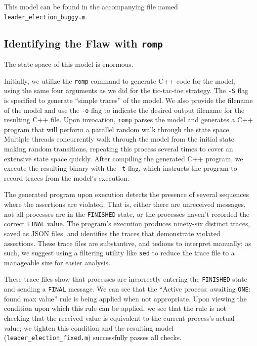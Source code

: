 This model can be found in the accompanying file named
\texttt{leader\_election\_buggy.m}.

\subsection{Identifying the Flaw with \texttt{romp}}\label{subsec:identifying-the-flaw-in-romp}

The state space of this model is enormous.

Initially, we utilize the \texttt{romp} command to generate C++ code for the
model, using the same four arguments as we did for the tic-tac-toe strategy.
The \texttt{-S} flag is specified to generate ``simple traces'' of the model.
We also provide the filename of the model and use the \texttt{-o} flag to
indicate the desired output filename for the resulting C++ file.
Upon invocation, \texttt{romp} parses the model and generates a C++ program
that will perform a parallel random walk through the state space.
Multiple threads concurrently walk through the model from the initial state
making random transitions, repeating this process several times to
cover an extensive state space quickly.
After compiling the generated C++ program, we execute the resulting binary
with the \texttt{-t} flag, which instructs the program to record traces from
the model's execution.

The generated program upon execution detects the presence of several sequences
where the assertions are violated.
That is, either there are unreceived messages,
not all processes are in the \texttt{FINISHED} state,
or the processes haven't recorded the correct \texttt{FINAL} value.
The program's execution produces ninety-six distinct traces,
saved as JSON files, and identifies the traces that demonstrate violated
assertions.
These trace files are substantive, and tedious to interpret manually;
as such, we suggest using a filtering utility like \texttt{sed}
to reduce the trace file to a manageable size for easier analysis.

These trace files show that processes are incorrectly entering the
\texttt{FINISHED} state and sending a \texttt{FINAL} message.
We can see that the ``Active process: awaiting \texttt{ONE}: found max value''
rule is being applied when not appropriate.
Upon viewing the condition upon which this rule can be applied, we see that
the rule is not checking that the received value is equivalent to the
current process's actual value;
we tighten this condition and the resulting model
(\texttt{leader\_election\_fixed.m}) successfully passes all checks.

